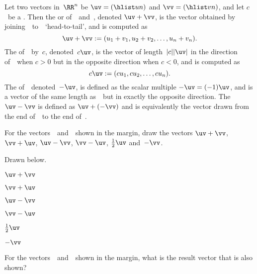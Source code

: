 \begin{definition} \label{def:vecops}
Let two vectors in~\(\RR^n\) be \(\uv=(\hlist un)\) and \(\vv=(\hlist vn)\), and let \(c\)~be a .
Then the  or  of~\uv\ and~\vv, denoted \(\uv+\vv\), is the vector obtained by joining~\vv\ to~\uv\ `head-to-tail', and is computed as
\begin{equation*}
\uv+\vv:=(u_1+v_1,u_2+v_2,\ldots,u_n+v_n).
\end{equation*}
The  of~\uv\ by~\(c\), denoted~\(c\uv\),  is the vector of length~\(|c||\uv|\) in the direction of~\uv\ when \(c>0\) but in the opposite direction when \(c<0\), and is computed as
\begin{equation*}
c\uv:=(cu_1,cu_2,\ldots,cu_n).
\end{equation*}
The  of~\uv\, denoted~\(-\uv\), is defined as the scalar multiple \(-\uv=(-1)\uv\), and is a vector of the same length as~\uv\ but in exactly the opposite direction.
The  \(\uv-\vv\) is defined as \(\uv+(-\vv)\) and is equivalently the vector drawn from the end of~\vv\ to the end of~\uv.
\end{definition}



\begin{example} \label{eg:}
For the vectors~\uv\ and~\vv\ shown in the margin, draw the vectors
\(\uv+\vv\), \(\vv+\uv\), \(\uv-\vv\), \(\vv-\uv\), \(\tfrac12\uv\) and~\(-\vv\).

\begin{solution} Drawn below.
\begin{parts}
\item $\uv+\vv$ 
\item $\vv+\uv$ 
\item $\uv-\vv$ 
\item $\vv-\uv$ 
\item $\tfrac12\uv$ 
\item $-\vv$ 
\end{parts}
\end{solution}
\end{example}




\begin{activity}
For the vectors~\uv\ and~\vv\ shown in the margin, what is the result vector that is also shown?
\actposs[4]{\(\vv-\uv\)}{\(\uv+\vv\)}{\(\vv+\uv\)}{\(\uv-\vv\)}
\end{activity}




